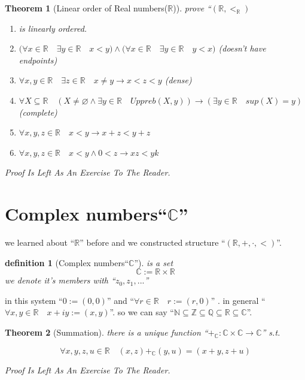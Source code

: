 \documentclass[10pt,a4paper]{book}
\let\emptyset\varnothing
\newtheorem{definition}{definition}[section]
\newtheorem{theorem}{Theorem}[section]
\begin{document}
\begin{theorem}
    [Linear order of Real numbers($\mathbb{R}$)] prove   ``$ (\mathbb{R} , <_\mathbb{R}  )  $
    \begin{enumerate}
        \setlength{\itemsep}{0pt} %
        \item        is linearly ordered.
        \item       $ \Big( \forall x \in \mathbb{R} \quad   \exists y \in \mathbb{R} \quad  x < y \Big)
                  \land \Big( \forall x \in \mathbb{R} \quad   \exists y \in \mathbb{R} \quad   y < x \Big)  $ (doesn't have endpoints)
        \item       $  \forall x,y  \in \mathbb{R} \quad \exists z \in \mathbb{R} \quad  x \not= y \to   x < z < y  $ (dense)
        \item       $  \forall X  \subseteq \mathbb{R} \quad  (X \not= \emptyset \land \exists y \in \mathbb{R} \quad Uppreb(X,y))
                  \to (\exists y \in \mathbb{R} \quad  sup(X)=y)  $ (complete)
        \item       $\forall x ,y ,z \in \mathbb{R} \quad x  < y  \to x  + z < y  + z  $
        \item       $\forall x ,y ,z \in \mathbb{R} \quad x  < y  \land 0 < z \to x  z < y  k  $
    \end{enumerate}
    Proof Is Left As An Exercise To The Reader.
\end{theorem}

\section{Complex numbers``$\mathbb{C}$''}

we learned about ``$\mathbb{R}$'' before and we constructed structure
``$(\mathbb{R} , + , \cdot , <)$''.

\begin{definition}[Complex numbers``$\mathbb{C}$''] is a set
    \[ \mathbb{C} := \mathbb{R} \times \mathbb{R} \]
    we denote it's members with ``$z_0 , z_1 ,...$''
\end{definition}

in this system ``$ 0 := (0,0)$'' and ``$ \forall r \in \mathbb{R} \quad r :=
    (r,0)$'' . in general ``$\forall x,y \in \mathbb{R} \quad x + iy := (x,y)$''.
so we can say ``$\mathbb{N} \subseteq \mathbb{Z} \subseteq \mathbb{Q} \subseteq
    \mathbb{R} \subseteq \mathbb{C}$''.

\begin{theorem}[Summation] there is a unique function ``$+_\mathbb{C} :\mathbb{C} \times \mathbb{C} \to \mathbb{C}$'' s.t.

    \[ \forall x , y , z , u \in \mathbb{R} \quad (x , z) +_\mathbb{C}  (y , u)  = (x + y, z + u) \]

    Proof Is Left As An Exercise To The Reader.
\end{theorem}
\end{document}
